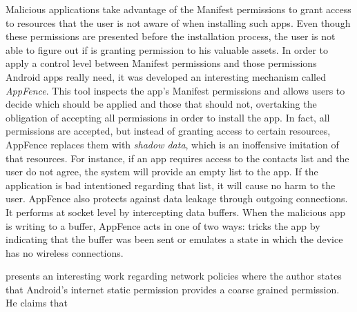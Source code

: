 Malicious applications take advantage of the Manifest permissions to grant access to resources that the user is not aware of when installing such apps. Even though these permissions are presented before the installation process, the user is not able to figure out if is granting permission to his valuable assets. In order to apply a control level between Manifest permissions and those permissions Android apps really need, it was developed an interesting mechanism called \textit{AppFence}. This tool inspects the app's Manifest permissions and allows users to decide which should be applied and those that should not, overtaking the obligation of accepting all permissions in order to install the app. In fact, all permissions are accepted, but instead of granting access to certain resources, AppFence replaces them with \textit{shadow data}, which is an inoffensive imitation of that resources. For instance, if an app requires access to the contacts list and the user do not agree, the system will provide an empty list to the app. If the application is bad intentioned regarding that list, it will cause no harm to the user.
AppFence also protects against data leakage through outgoing connections. It performs at socket level by intercepting data buffers. When the malicious app is writing to a buffer, AppFence acts in one of two ways: tricks the app by indicating that the buffer was been sent or emulates a state in which the device has no wireless connections.


presents an interesting work regarding network policies where the author states that Android's internet static permission provides a coarse grained permission. He claims that 




